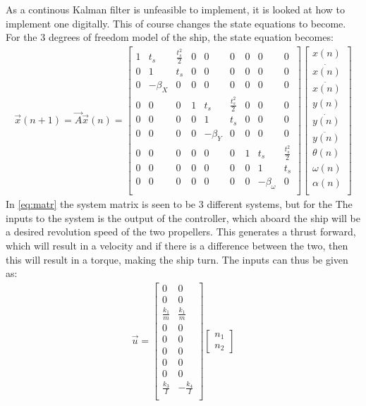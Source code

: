 As a continous Kalman filter is unfeasible to implement, it is looked at how to implement one digitally. This of course changes the state equations to become. For the 3 degrees of freedom model of the ship, the state equation becomes: 
\begin{align}
\vec{x}(n+1) = \vec{A}\vec{x}(n) = \begin{bmatrix}
1 & t_s & \frac{t_s^2}{2} & 0 & 0 & 0 & 0 & 0 & 0\\
0 & 1 & t_s & 0 & 0 & 0 & 0 & 0 & 0\\
0 & -\beta_X & 0 & 0 & 0 & 0 & 0 & 0 & 0\\
0 & 0 & 0 & 1 & t_s & \frac{t_s^2}{2} & 0 & 0 & 0\\
0 & 0 & 0 & 0 & 1 & t_s & 0 & 0 & 0\\
0 & 0 & 0 & 0 & -\beta_Y & 0 & 0 & 0 & 0\\
0 & 0 & 0 & 0 & 0 & 0 & 1 & t_s & \frac{t_s^2}{2}\\
0 & 0 & 0 & 0 & 0 & 0 & 0 & 1 & t_s\\
0 & 0 & 0 & 0 & 0 & 0 & 0 & -\beta_\omega & 0\\
\end{bmatrix}\begin{bmatrix}
x(n)\\
\dot{x(n)}\\
\ddot{x(n)}\\
y(n)\\
\dot{y(n)}\\
\ddot{y(n)}\\
\theta(n)\\
\omega(n)\\
\alpha(n)\\
\end{bmatrix}
\label{eq:matr}
\end{align}
In \vref{eq:matr} the system matrix is seen to be 3 different systems, but for the 
The inputs to the system is the output of the controller, which aboard the ship will be a desired revolution speed of the two propellers. This generates a thrust forward, which will result in a velocity and if there is a difference between the two, then this will result in a torque, making the ship turn. The inputs can thus be given as:
\begin{align}
\vec{u} = \begin{bmatrix}
0 & 0\\
0 & 0\\
\frac{k_1}{m} & \frac{k_1}{m}\\
0 & 0\\
0 & 0\\
0 & 0\\
0 & 0\\
0 & 0\\
\frac{k_3}{I} & -\frac{k_4}{I}\\
\end{bmatrix}\begin{bmatrix}
n_1\\
n_2
\end{bmatrix}
\end{align}

